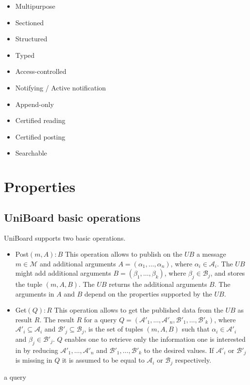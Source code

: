 \documentclass[bibtotoc,halfparskip,oneside]{scrreprt}
\newcommand{\UB}{\ensuremath{\mathit{UB}}\xspace}
\begin{document}
\begin{itemize}
	\item Multipurpose
	\item Sectioned
	\item Structured
	\item Typed
	\item Access-controlled
	\item Notifying / Active notification
	\item Append-only
	\item Certified reading
	\item Certified posting
	\item Searchable
\end{itemize}

\section{Properties}
\subsection{UniBoard basic operations}

UniBoard supports two basic operations.
\begin{itemize}
	\item Post$(m,A):B$ \newline This operation allows to publish on the \UB a message $m \in \mathcal{M}$ and additional arguments $A=(\alpha_1,\dots,\alpha_n)$, where $\alpha_i \in \mathcal{A}_i$. The \UB might add additional arguments $B=(\beta_1,\dots,\beta_k)$, where $\beta_j \in \mathcal{B}_j$, and stores the tuple $(m,A,B)$. The \UB returns the additional arguments $B$. The arguments in $A$ and $B$ depend on the properties supported by the \UB.
	\item Get$(Q):R$ \newline This operation allows to get the published data from the \UB as result $R$. The result $R$ for a query $Q=(\mathcal{A}'_1, \dots , \mathcal{A}'_n, \mathcal{B}'_1, \dots, \mathcal{B}'_k)$, where $\mathcal{A}'_i \subseteq  \mathcal{A}_i$ and  $\mathcal{B}'_j \subseteq  \mathcal{B}_j$, is the set of tuples $(m,A,B)$ such that $\alpha_i \in \mathcal{A}'_i$ and $\beta_j \in \mathcal{B}'_j$. $Q$ enables one to retrieve only the information one is interested in by reducing $\mathcal{A}'_1, \dots , \mathcal{A}'_n$ and $\mathcal{B}'_1, \dots , \mathcal{B}'_k$ to the desired values. If $\mathcal{A}'_i$ or $\mathcal{B}'_j$ is missing in $Q$ it is assumed to be equal to $\mathcal{A}_i$ or $\mathcal{B}_j$ respectively.
\end{itemize}
 a query   
\end{document}

